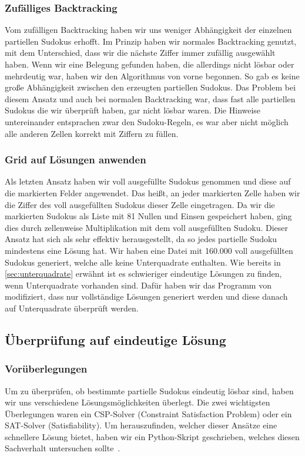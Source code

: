 \subsubsection{Zufälliges Backtracking}
Vom zufälligen Backtracking haben wir uns weniger Abhängigkeit der einzelnen partiellen Sudokus erhofft.
Im Prinzip haben wir normales Backtracking genutzt, mit dem Unterschied, dass wir die nächste Ziffer immer zufällig ausgewählt haben.
Wenn wir eine Belegung gefunden haben, die allerdings nicht lösbar oder mehrdeutig war,
haben wir den Algorithmus von vorne begonnen.
So gab es keine große Abhängigkeit zwischen den erzeugten partiellen Sudokus.
Das Problem bei diesem Ansatz und auch bei normalen Backtracking war,
dass fast alle partiellen Sudokus die wir überprüft haben, gar nicht lösbar waren.
Die Hinweise untereinander entsprachen zwar den Sudoku-Regeln, es war aber nicht möglich alle anderen Zellen korrekt mit Ziffern zu füllen.

\subsubsection{Grid auf Lösungen anwenden}
Als letzten Ansatz haben wir voll ausgefüllte Sudokus genommen und diese auf die markierten Felder angewendet.
Das heißt, an jeder markierten Zelle haben wir die Ziffer des voll ausgefüllten Sudokus dieser Zelle eingetragen.
Da wir die markierten Sudokus als Liste mit 81 Nullen und Einsen gespeichert haben,
ging dies durch zellenweise Multiplikation mit dem voll ausgefüllten Sudoku.
Dieser Ansatz hat sich als sehr effektiv herausgestellt, da so jedes partielle Sudoku mindestens eine Lösung hat.
Wir haben eine Datei mit 160.000 voll ausgefüllten Sudokus generiert, welche alle keine Unterquadrate enthalten.
Wie bereits in \cref{sec:unterquadrate} erwähnt ist es schwieriger eindeutige Lösungen zu finden, wenn Unterquadrate vorhanden sind.
Dafür haben wir das Programm von~\cite{stunmuffin_sudoku_generator_2025} modifiziert, dass nur vollständige Lösungen generiert werden
und diese danach auf Unterquadrate überprüft werden.


\subsection{Überprüfung auf eindeutige Lösung}
\subsubsection{Vorüberlegungen}
Um zu überprüfen, ob bestimmte partielle Sudokus eindeutig lösbar sind, haben wir uns verschiedene Lösungsmöglichkeiten überlegt.
Die zwei wichtigsten Überlegungen waren ein CSP-Solver (Constraint Satisfaction Problem) oder ein SAT-Solver (Satisfiability).
Um herauszufinden, welcher dieser Ansätze eine schnellere Lösung bietet, haben wir ein Python-Skript geschrieben, welches diesen Sachverhalt untersuchen sollte~\cite{sat_csp_comparison}.

